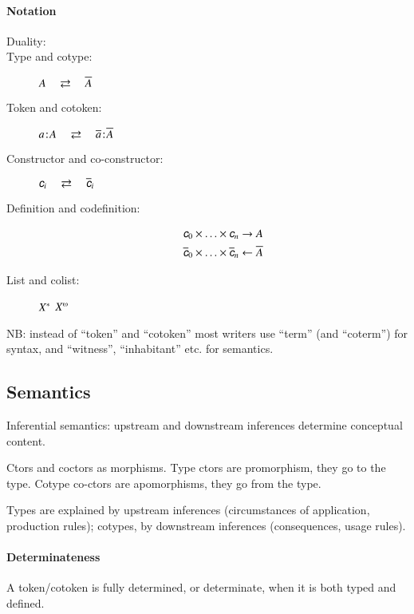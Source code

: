 \documentclass{article}
\begin{document}
\paragraph{Notation}

\begin{description}
\item[Duality:] \dual
\item[Type and cotype:]\hspace{2em}\(A\hspace{1em}\rightleftarrows\hspace{1em} \overline{A}\)
\item[Token and cotoken:] \(a\hspace{1pt}\mathpunct{:}\hspace{-1pt}A\hspace{1em}\rightleftarrows\hspace{1em}
  \overline{a}\hspace{1pt}\mathpunct{:}\hspace{-1pt}\overline{A}\)
    \item[Constructor and co-constructor:] \(\ctor{i}\dual \coctor{i}\)
    \item[Definition and codefinition:]

      \begin{align}
       \ctor{0}\times\ldots\times\ctor{n} & \rightarrow A \nonumber \\
       \coctor{0}\times\ldots\times\coctor{n} & \leftarrow \cotype{A} \nonumber
      \end{align}
      \item[List and colist:] \({X^{*}}\) \dual \(\colist{X}\)
\end{description}

NB: instead of ``token'' and ``cotoken'' most writers use ``term''
(and ``coterm'') for syntax, and ``witness'', ``inhabitant'' etc. for
semantics.

\subsection{Semantics}

Inferential semantics: upstream and downstream inferences determine
conceptual content.

Ctors and coctors as morphisms. Type ctors are promorphism, they go to
the type. Cotype co-ctors are apomorphisms, they go from the type.

Types are explained by upstream inferences (circumstances of
application, production rules); cotypes, by downstream inferences
(consequences, usage rules).

\paragraph{Determinateness}

A token/cotoken is fully determined, or determinate, when it is both typed and defined.
\end{document}
